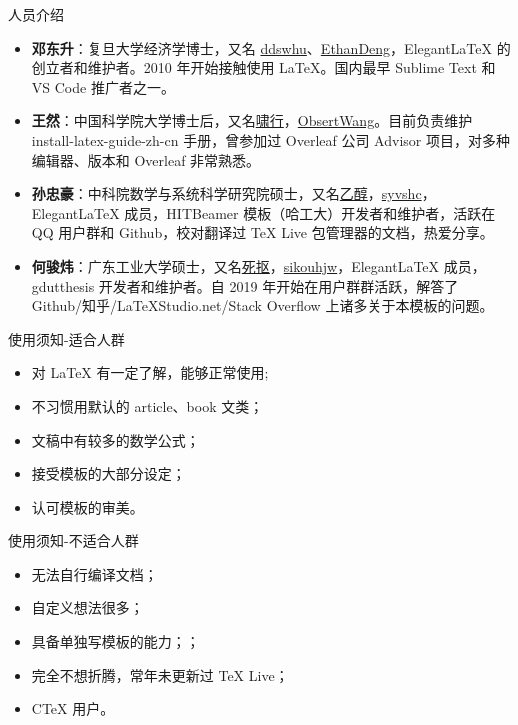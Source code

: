\documentclass[8pt]{beamer}
\begin{document}
\begin{frame}{人员介绍}
  \begin{itemize}
    \item \textcolor{iron}{\bfseries 邓东升}：复旦大学经济学博士，又名 \underline{ddswhu}、\underline{EthanDeng}，Elegant\LaTeX{} 的创立者和维护者。2010 年开始接触使用 \LaTeX{}。国内最早 Sublime Text 和 VS Code 推广者之一。\\[2ex]
    \item \textcolor{iron}{\bfseries 王然}：中国科学院大学博士后，又名\underline{啸行}，\underline{ObsertWang}。目前负责维护 install-latex-guide-zh-cn 手册，曾参加过 Overleaf 公司 Advisor 项目，对多种编辑器、版本和 Overleaf 非常熟悉。
    \item \textcolor{iron}{\bfseries 孙忠豪}：中科院数学与系统科学研究院硕士，又名\underline{乙醇}，\underline{syvshc}，Elegant\LaTeX{} 成员，HITBeamer 模板（哈工大）开发者和维护者，活跃在 QQ 用户群和 Github，校对翻译过 \TeX{} Live 包管理器的文档，热爱分享。\\[2ex]
    \item \textcolor{iron}{\bfseries 何骏炜}：广东工业大学硕士，又名\underline{死抠}，\underline{sikouhjw}，Elegant\LaTeX{} 成员，gdutthesis 开发者和维护者。自 2019 年开始在用户群群活跃，解答了 Github/知乎/LaTeXStudio.net/Stack Overflow 上诸多关于本模板的问题。\\[2ex]
  \end{itemize}
\end{frame}


\begin{frame}{使用须知-适合人群}
  \begin{itemize}
    \item 对 \LaTeX{} 有一定了解，能够正常使用;
    \item 不习惯用默认的 article、book 文类；
    \item 文稿中有较多的数学公式；
    \item 接受模板的大部分设定；
    \item 认可模板的审美。
  \end{itemize}  
\end{frame}


\begin{frame}{使用须知-不适合人群}
  \begin{itemize}
    \item 无法自行编译文档；
    \item 自定义想法很多；
    \item 具备单独写模板的能力；；
    \item 完全不想折腾，常年未更新过 TeX Live；
    \item CTeX 用户。
  \end{itemize}  
\end{frame}
\end{document}

